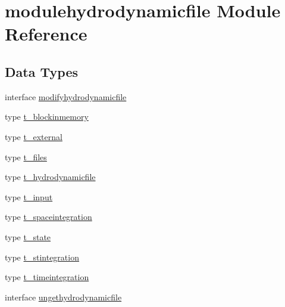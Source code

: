 \hypertarget{namespacemodulehydrodynamicfile}{}\section{modulehydrodynamicfile Module Reference}
\label{namespacemodulehydrodynamicfile}
\subsection*{Data Types}
\begin{DoxyCompactItemize}
\item 
interface \mbox{\hyperlink{interfacemodulehydrodynamicfile_1_1modifyhydrodynamicfile}{modifyhydrodynamicfile}}
\item 
type \mbox{\hyperlink{structmodulehydrodynamicfile_1_1t__blockinmemory}{t\+\_\+blockinmemory}}
\item 
type \mbox{\hyperlink{structmodulehydrodynamicfile_1_1t__external}{t\+\_\+external}}
\item 
type \mbox{\hyperlink{structmodulehydrodynamicfile_1_1t__files}{t\+\_\+files}}
\item 
type \mbox{\hyperlink{structmodulehydrodynamicfile_1_1t__hydrodynamicfile}{t\+\_\+hydrodynamicfile}}
\item 
type \mbox{\hyperlink{structmodulehydrodynamicfile_1_1t__input}{t\+\_\+input}}
\item 
type \mbox{\hyperlink{structmodulehydrodynamicfile_1_1t__spaceintegration}{t\+\_\+spaceintegration}}
\item 
type \mbox{\hyperlink{structmodulehydrodynamicfile_1_1t__state}{t\+\_\+state}}
\item 
type \mbox{\hyperlink{structmodulehydrodynamicfile_1_1t__stintegration}{t\+\_\+stintegration}}
\item 
type \mbox{\hyperlink{structmodulehydrodynamicfile_1_1t__timeintegration}{t\+\_\+timeintegration}}
\item 
interface \mbox{\hyperlink{interfacemodulehydrodynamicfile_1_1ungethydrodynamicfile}{ungethydrodynamicfile}}
\end{DoxyCompactItemize}
